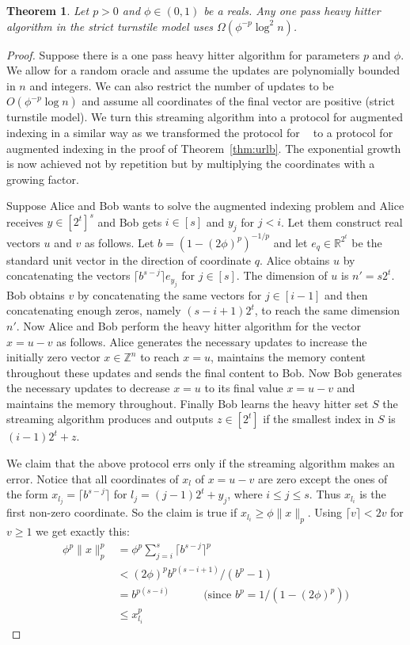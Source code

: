 \documentclass[9pt,letterpaper]{article}
\newtheorem{theorem}{Theorem}
\theoremstyle{remark}
\DeclareMathOperator{\URn}{UR^n}
\begin{document}
\begin{theorem}\label{hhl} Let $p>0$ and $\phi\in(0,1)$ be a reals. Any one
  pass heavy hitter algorithm in the strict turnstile model uses
  $\Omega(\phi^{-p}\log^2n)$.
\end{theorem}

\begin{proof} Suppose there is a one pass heavy hitter algorithm for
  parameters $p$ and $\phi$. We allow for a
  random oracle and assume the updates are polynomially bounded in $n$ and
  integers. We can also restrict the number of updates to be $O(\phi^{-p}\log
  n)$ and assume all coordinates of the final vector are positive (strict
  turnstile model). We turn this streaming algorithm into a protocol for
  augmented indexing in a similar way as we transformed the protocol for
  $\URn$ to a protocol for augmented indexing in the proof of
  Theorem~\ref{thm:urlb}. The exponential growth is now achieved not by
  repetition but by multiplying the coordinates with a growing factor.

Suppose Alice and Bob wants to
solve the augmented indexing problem and Alice receives $y\in[2^t]^s$ and Bob
gets $i\in [s]$ and $y_j$ for $j<i$. Let them construct real vectors $u$ and
$v$ as follows. Let $b=(1-(2\phi)^p)^{-1/p}$ and let $e_q\in\mathbb R^{2^t}$
be the standard unit vector in the direction of coordinate $q$. Alice obtains
$u$ by concatenating the vectors $\lceil b^{s-j}\rceil e_{y_j}$ for
$j\in[s]$. The dimension of $u$ is $n'=s2^t$. Bob
obtains $v$ by concatenating the same vectors for $j\in[i-1]$ and then
concatenating enough zeros, namely $(s-i+1)2^t$, to reach the same dimension
$n'$. Now Alice and Bob perform the heavy hitter algorithm for the vector
$x=u-v$ as follows. Alice generates the necessary updates to increase the
initially zero vector $x\in\mathbb Z^n$ to reach $x=u$, maintains the memory
content throughout these updates and sends the final content to Bob. Now Bob
generates the necessary updates to decrease $x=u$ to its final value $x=u-v$
and maintains the memory throughout. Finally Bob learns the heavy hitter set
$S$ the streaming algorithm produces and outputs $z\in[2^t]$ if the smallest
index in $S$ is $(i-1)2^t+z$.

We claim that the above protocol errs only if the streaming algorithm makes an
error. Notice that all coordinates of $x_l$ of $x=u-v$ are zero except the
ones of the form $x_{l_j}=\lceil b^{s-j}\rceil$ for $l_j=(j-1)2^t+y_j$, where
$i\le j\le s$. Thus $x_{l_i}$ is the first non-zero coordinate. So the claim
is true if $x_{l_i}\ge\phi\|x\|_p$. Using $\lceil v\rceil<2v$ for $v\ge1$ we
get exactly this:
\begin{align*}
\phi^p\|x\|_p^p &= \phi^p\sum_{j=i}^s\lceil b^{s-j}\rceil^p\\
&<(2\phi)^pb^{p(s-i+1)}/(b^p-1)\\
&=b^{p(s-i)} \quad\qquad\text{(since $b^p =1/(1-(2\phi)^p)$)}\\
&\le x_{l_i}^p
\end{align*}


\end{proof}
\end{document}
